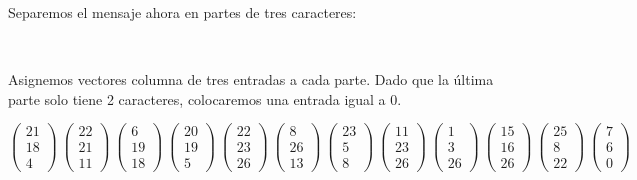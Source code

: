 \documentclass[12pt,a4paper]{article}
\begin{document}
Separemos el mensaje ahora en partes de tres caracteres:

\vspace{0.2cm}
\begin{center}
 ~ ~ ~\textara{\th}~  ~~   ~ ~ ~ ~  ~
\end{center}
\vspace{0.2cm}

Asignemos vectores columna de tres entradas a cada parte. Dado que la \'ultima parte solo tiene 2 caracteres, colocaremos una entrada igual a 0.

{\tiny $$\left(\begin{array}{c}21\\18\\4\end{array}\right)~\left(\begin{array}{c}22\\21\\11\end{array}\right)~\left(\begin{array}{c}6\\19\\18\end{array}\right)~\left(\begin{array}{c}20\\19\\5\end{array}\right)~\left(\begin{array}{c}22\\23\\26\end{array}\right)~\left(\begin{array}{c}8\\26\\13\end{array}\right)~\left(\begin{array}{c}23\\5\\8\end{array}\right)~\left(\begin{array}{c}11\\23\\26\end{array}\right)~\left(\begin{array}{c}1\\3\\26\end{array}\right)~\left(\begin{array}{c}15\\16\\26\end{array}\right)~\left(\begin{array}{c}25\\8\\22\end{array}\right)~\left(\begin{array}{c}7\\6\\0\end{array}\right)$$}
 
\end{document}
